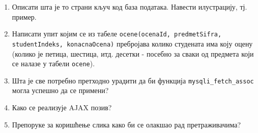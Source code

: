 \documentclass[a4paper]{article}
\begin{document}
\begin{enumerate}
\hrulefill

\item Описати шта је то страни кључ код база података. Навести илустрацију, тј. пример.

\hrulefill

\hrulefill

\hrulefill

\item Написати упит којим се из табеле \verb|ocene(ocenaId, predmetSifra, studentIndeks, konacnaOcena)| 
пребројава колико студената има коју оцену (колико је петица, шестица, итд. десетки - 
посебно за сваки од предмета који се налазе у табели \verb|ocene|).

\hrulefill

\hrulefill

\hrulefill

\item Шта је све потребно претходно урадити да би функција \verb|mysqli_fetch_assoc| могла успешно да се примени?

\hrulefill

\hrulefill

\hrulefill

\item Како се реализује AJAX позив?

\hrulefill

\hrulefill

\hrulefill

\item Препоруке за коришћење слика како би се олакшао рад претраживачима?

\hrulefill

\hrulefill

\hrulefill
\end{enumerate}
\end{document}
